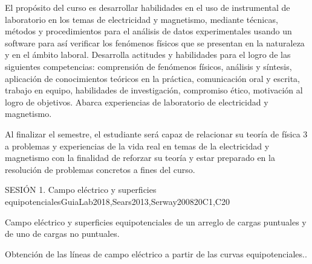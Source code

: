 \begin{syllabus}


\begin{justification}
El propósito del curso es desarrollar habilidades en el uso de instrumental de laboratorio en los temas de electricidad y magnetismo, mediante técnicas, métodos y procedimientos para el análisis de datos experimentales usando un software para así verificar los fenómenos físicos que se presentan en la naturaleza y en el ámbito laboral. Desarrolla actitudes y habilidades para el logro de las siguientes competencias: comprensión de fenómenos físicos, análisis y síntesis, aplicación de conocimientos teóricos en la práctica, comunicación oral y escrita, trabajo en equipo, habilidades de investigación, compromiso ético, motivación al logro de objetivos. Abarca experiencias de laboratorio de electricidad y magnetismo. 
\end{justification}

\begin{goals}
\item Al finalizar el semestre, el estudiante será capaz de relacionar su teoría de física 3 a problemas y experiencias de la vida real en temas de la electricidad y magnetismo con la finalidad de reforzar su teoría y estar preparado en la resolución de problemas concretos a fines del curso.
\end{goals}

\begin{outcomes}
\item {}
\item {}
\end{outcomes}

\begin{competences}
    \item {}
\end{competences}

\begin{unit}{SESIÓN 1. Campo eléctrico y superficies equipotenciales}{}{GuiaLab2018,Sears2013,Serway2008}{20}{C1,C20}
\begin{topics}
      \item Campo eléctrico y superficies equipotenciales de un arreglo de cargas puntuales y de uno de cargas no puntuales.
      \item Obtención de las líneas de campo eléctrico a partir de las curvas equipotenciales..
\end{topics}
\end{unit}


\end{syllabus}
